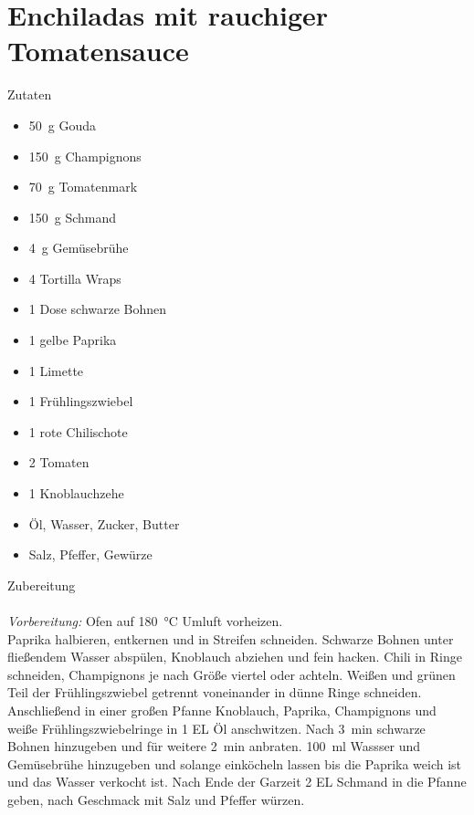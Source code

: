 \section*{Enchiladas mit rauchiger Tomatensauce}
\ihead{}\ohead{}
\cfoot{}
{\Large Zutaten}
\begin{multicols}{2}
\begin{itemize}
    \item \SI{50}{g} Gouda
    \item \SI{150}{g} Champignons
    \item \SI{70}{g} Tomatenmark
    \item \SI{150}{g} Schmand
    \item \SI{4}{g} Gemüsebrühe
    \item \num{4} Tortilla Wraps
    \item \num{1} Dose schwarze Bohnen
    \item \num{1} gelbe Paprika
    \item \num{1} Limette
    \item \num{1} Frühlingszwiebel
    \item \num{1} rote Chilischote
    \item \num{2} Tomaten
    \item \num{1} Knoblauchzehe
    \item Öl, Wasser, Zucker, Butter
    \item Salz, Pfeffer, Gewürze
\end{itemize}
\end{multicols}
\noindent
{\Large Zubereitung}\\
\\
\textit{Vorbereitung:} Ofen auf \SI{180}{\celsius} Umluft vorheizen.\\
Paprika halbieren, entkernen und in Streifen schneiden.
Schwarze Bohnen unter fließendem Wasser abspülen, Knoblauch abziehen und fein hacken.
Chili in Ringe schneiden, Champignons je nach Größe viertel oder achteln.
Weißen und grünen Teil der Frühlingszwiebel getrennt voneinander in dünne Ringe schneiden.
Anschließend in einer großen Pfanne Knoblauch, Paprika, Champignons und weiße Frühlingszwiebelringe in \num{1} EL Öl anschwitzen.
Nach \SI{3}{min} schwarze Bohnen hinzugeben und für weitere \SI{2}{min} anbraten.
\SI{100}{ml} Wassser und Gemüsebrühe hinzugeben und solange einköcheln lassen bis die Paprika weich ist und das Wasser verkocht ist.
Nach Ende der Garzeit \num{2} EL Schmand in die Pfanne geben, nach Geschmack mit Salz und Pfeffer würzen.
